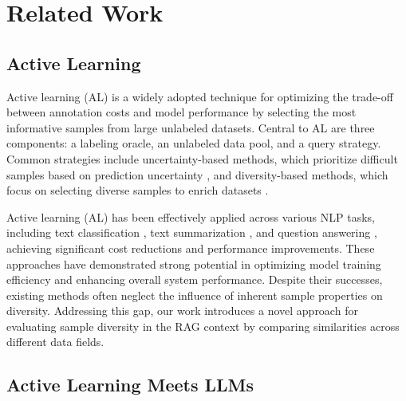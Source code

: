 \section{Related Work}
\subsection{Active Learning}

Active learning (AL) is a widely adopted technique for optimizing the trade-off between annotation costs and model performance by selecting the most informative samples from large unlabeled datasets. Central to AL are three components: a labeling oracle, an unlabeled data pool, and a query strategy. Common strategies include uncertainty-based methods, which prioritize difficult samples based on prediction uncertainty \cite{beluch2018power,liu2021influence,schroder2021revisiting,maekawa2022low,rouzegar2024enhancing}, and diversity-based methods, which focus on selecting diverse samples to enrich datasets \cite{hasan2018context,sinha2019variational,agarwal2020contextual,maekawa2022low,xie2023active}. 

Active learning (AL) has been effectively applied across various NLP tasks, including text classification \cite{yan2020active,schroder2021revisiting}, text summarization \cite{gidiotis2022should,tsvigun2022active}, and question answering \cite{karamcheti2021mind,padmakumar2021dialog}, achieving significant cost reductions and performance improvements. These approaches have demonstrated strong potential in optimizing model training efficiency and enhancing overall system performance. Despite their successes, existing methods often neglect the influence of inherent sample properties on diversity. Addressing this gap, our work introduces a novel approach for evaluating sample diversity in the RAG context by comparing similarities across different data fields.

\subsection{Active Learning Meets LLMs}

